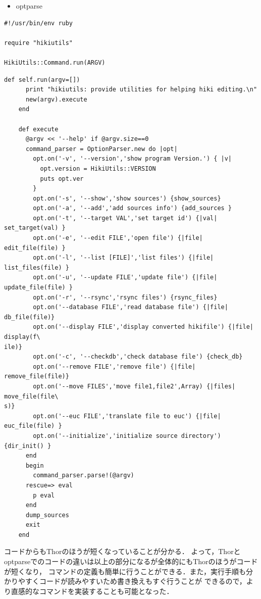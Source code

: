 \begin{itemize}
\item optparse
\end{itemize}\begin{lstlisting}[style=customRuby]
#!/usr/bin/env ruby                                                             

require "hikiutils"

HikiUtils::Command.run(ARGV)
\end{lstlisting}\begin{lstlisting}[style=customRuby]
    def self.run(argv=[])
      print "hikiutils: provide utilities for helping hiki editing.\n"
      new(argv).execute
    end

    def execute
      @argv << '--help' if @argv.size==0
      command_parser = OptionParser.new do |opt|
        opt.on('-v', '--version','show program Version.') { |v|
          opt.version = HikiUtils::VERSION
          puts opt.ver
        }
        opt.on('-s', '--show','show sources') {show_sources}
        opt.on('-a', '--add','add sources info') {add_sources }
        opt.on('-t', '--target VAL','set target id') {|val| set_target(val) }
        opt.on('-e', '--edit FILE','open file') {|file| edit_file(file) }
        opt.on('-l', '--list [FILE]','list files') {|file| list_files(file) }
        opt.on('-u', '--update FILE','update file') {|file| update_file(file) }
        opt.on('-r', '--rsync','rsync files') {rsync_files}
        opt.on('--database FILE','read database file') {|file| db_file(file)}
        opt.on('--display FILE','display converted hikifile') {|file| display(f\
ile)}
        opt.on('-c', '--checkdb','check database file') {check_db}
        opt.on('--remove FILE','remove file') {|file| remove_file(file)}
        opt.on('--move FILES','move file1,file2',Array) {|files| move_file(file\
s)}
        opt.on('--euc FILE','translate file to euc') {|file| euc_file(file) }
        opt.on('--initialize','initialize source directory') {dir_init() }
      end
      begin
        command_parser.parse!(@argv)
      rescue=> eval
        p eval
      end
      dump_sources
      exit
    end  
\end{lstlisting}
コードからもThorのほうが短くなっていることが分かる．
よって，Thorとoptparseでのコードの違いは以上の部分になるが全体的にもThorのほうがコードが短くなり，
コマンドの定義も簡単に行うことができる．また，実行手順も分かりやすくコードが読みやすいため書き換えもすぐ行うことが
できるので，より直感的なコマンドを実装することも可能となった．

